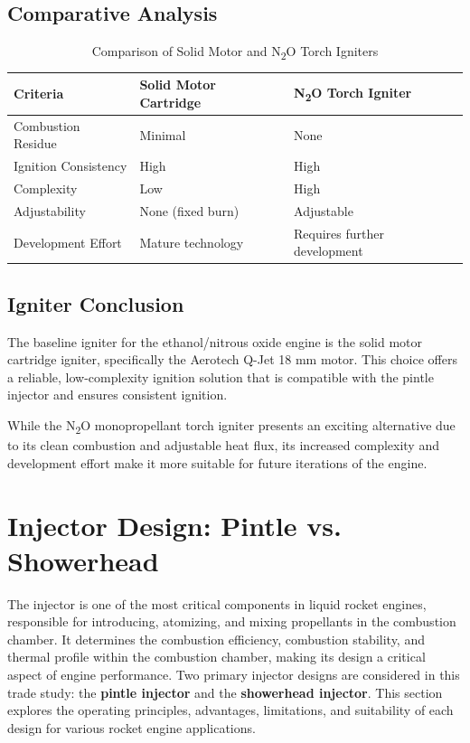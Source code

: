 \subsection{Comparative Analysis}

\begin{table}[H]
    \centering
    \begin{tabular}{|l|l|l|}
        \hline
        \textbf{Criteria} & \textbf{Solid Motor Cartridge} & \textbf{N\textsubscript{2}O Torch Igniter} \\
        \hline
        Combustion Residue & Minimal & None \\
        \hline
        Ignition Consistency & High & High \\
        \hline
        Complexity & Low & High \\
        \hline
        Adjustability & None (fixed burn) & Adjustable \\
        \hline
        Development Effort & Mature technology & Requires further development \\
        \hline
    \end{tabular}
    \caption{Comparison of Solid Motor and N\textsubscript{2}O Torch Igniters}
    \label{tab:igniter_comparison}
\end{table}



\subsection{Igniter Conclusion}

The baseline igniter for the ethanol/nitrous oxide engine is the solid motor cartridge igniter, specifically the Aerotech Q-Jet 18 mm motor. This choice offers a reliable, low-complexity ignition solution that is compatible with the pintle injector and ensures consistent ignition. 

While the N\textsubscript{2}O monopropellant torch igniter presents an exciting alternative due to its clean combustion and adjustable heat flux, its increased complexity and development effort make it more suitable for future iterations of the engine.


\section{Injector Design: Pintle vs. Showerhead}

The injector is one of the most critical components in liquid rocket engines, responsible for introducing, atomizing, and mixing propellants in the combustion chamber. It determines the combustion efficiency, combustion stability, and thermal profile within the combustion chamber, making its design a critical aspect of engine performance. Two primary injector designs are considered in this trade study: the \textbf{pintle injector} and the \textbf{showerhead injector}. This section explores the operating principles, advantages, limitations, and suitability of each design for various rocket engine applications.


